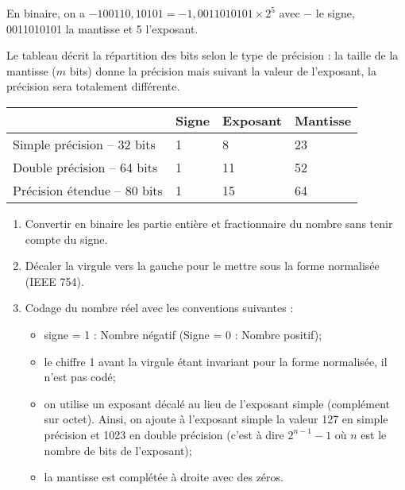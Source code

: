 \begin{exemple}
En binaire, on a $-100110,10101 =  -1,0011010101\times 2^5$ avec $-$ le signe, 0011010101 la mantisse et 5 l'exposant.
\end{exemple}


Le tableau décrit la répartition des bits selon le type de précision : la taille de la mantisse ($m$ bits) donne la précision mais suivant la valeur de l'exposant, la précision sera totalement différente. 

%

\begin{center}
\begin{tabular}{llll}
\cline{2-4}
& Signe & Exposant & Mantisse \\ \hline
 Simple précision -- 32 bits & 1 & 8 & 23 \\ \hline
 Double précision -- 64 bits & 1 & 11 & 52 \\ \hline
 Précision étendue -- 80 bits & 1 & 15 & 64 \\ \hline
\end{tabular}
\end{center}



\begin{methode}
\begin{enumerate}
\item Convertir en binaire les partie entière et fractionnaire du nombre sans tenir compte du signe.
\item Décaler la virgule vers la gauche pour le mettre sous la forme normalisée (IEEE 754).
\item Codage du nombre réel avec les conventions suivantes : 
\begin{itemize}
\item signe = 1 : Nombre négatif 	(Signe = 0 : Nombre positif);
\item le chiffre 1 avant la virgule étant invariant pour la forme normalisée, il n’est pas codé;
\item on utilise un exposant décalé au lieu de l’exposant simple (complément sur octet). Ainsi, on ajoute à l’exposant simple la valeur 127 en simple précision et 1023 en double précision (c’est à dire $2^{n-1}-1$ où $n$ est le nombre de bits de l’exposant);
\item la mantisse est complétée à droite avec des zéros.
\end{itemize}
\end{enumerate}
\end{methode}


